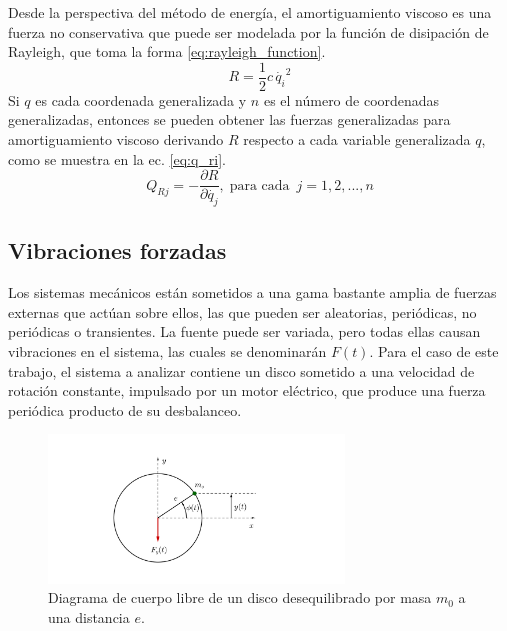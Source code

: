 Desde la perspectiva del método de energía, el amortiguamiento viscoso es una fuerza no conservativa que puede ser modelada por la función de disipación de Rayleigh, que toma la forma \ref{eq:rayleigh_function}.
\begin{equation}\label{eq:rayleigh_function}
	R = \frac{1}{2}c\,\dot{q_i}^2
\end{equation} 
Si $q$ es cada coordenada generalizada y $n$ es el número de coordenadas generalizadas, entonces se pueden obtener las fuerzas generalizadas para amortiguamiento viscoso derivando $R$ respecto a cada variable generalizada $q$, como se muestra en la ec. \ref{eq:q_ri}.
\begin{equation}\label{eq:q_ri}
	Q_{Rj} = -\frac{\partial R}{\partial \dot{q_j}}, \; \text{para cada }\, j=1,2,...,n
\end{equation}

\subsection{Vibraciones forzadas}
\label{sec:vib_forzadas}
Los sistemas mecánicos están sometidos a una gama bastante amplia de fuerzas externas que actúan sobre ellos, las que pueden ser aleatorias, periódicas, no periódicas o transientes. La fuente puede ser variada, pero todas ellas causan vibraciones en el sistema, las cuales se denominarán $F(t)$. Para el caso de este trabajo, el sistema a analizar contiene un disco sometido a una velocidad de rotación constante, impulsado por un motor eléctrico, que produce una fuerza periódica producto de su desbalanceo.

\begin{figure}[h]
\centering
\includegraphics[width=0.7\textwidth, trim={6cm 2cm 10cm 3cm}, clip]{Imagenes/dcl_maqdes.pdf}
\caption{Diagrama de cuerpo libre de un disco desequilibrado por masa $m_0$ a una distancia $e$.}
\label{fig:dcl_maqdes}
\end{figure}


